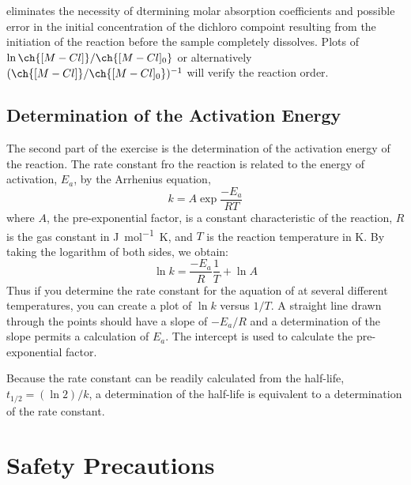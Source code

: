  eliminates the necessity of dtermining molar absorption coefficients and possible error in the initial concentration of the dichloro compoint resulting from the initiation of the reaction before the sample completely dissolves. 
Plots of \(\ln{\ch{[M-Cl]}/\ch{[M-Cl]_0}}\) or alternatively \(({\ch{[M-Cl]}/\ch{[M-Cl]_0}})^{-1}\)  will verify the reaction order. 

\subsection{Determination of the Activation Energy}
\label{subs:determination_of_activation_energy}

The second part of the exercise is the determination of the activation energy of the reaction. 
The rate constant fro the reaction is related to the energy of activation, \(E_a\), by the Arrhenius equation, 
\begin{equation}
	k = A \exp{\frac{-E_a}{RT}}
	\label{eq:arrhenius}
\end{equation}
where \(A\), the pre-exponential factor, is a constant characteristic of the reaction, \(R\) is the gas constant in \unit{\joule\per\mole\kelvin}, and \(T\) is the reaction temperature in \unit{\kelvin}. 
By taking the logarithm of both sides, we obtain:
\begin{equation}
	\ln{k} = \frac{-E_a}{R} \frac{1}{T} + \ln{A}
	\label{eq:arrhenius_linear}
\end{equation}
Thus if you determine the rate constant for the aquation of  at several different temperatures, you can create a plot of \(\ln{k}\) versus \(1/T\). 
A straight line drawn through the points should have a slope of \(-E_a/R\) and a determination of the slope permits a calculation of \(E_a\). 
The intercept is used to calculate the pre-exponential factor. 

Because the rate constant can be readily calculated from the half-life, \(t_{1/2} = (\ln{2}) / k\), a determination of the half-life is equivalent to a determination of the rate constant. 

\section{Safety Precautions}
\label{sec:safety}

